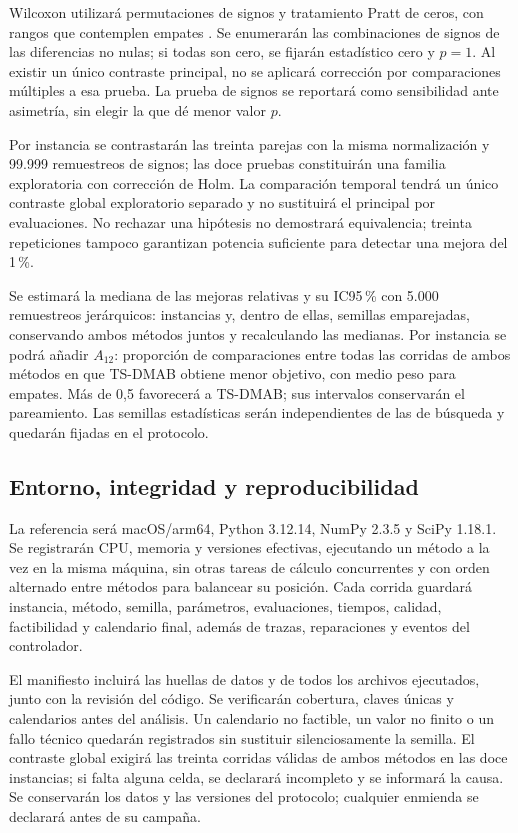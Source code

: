 Wilcoxon utilizará permutaciones de signos y tratamiento Pratt de ceros,
con rangos que contemplen empates
\parencite{scipy_wilcoxon,scipy_permutation}.
Se enumerarán las combinaciones de signos de las diferencias no nulas;
si todas son cero, se fijarán estadístico cero y $p=1$.
Al existir un único contraste principal, no se aplicará corrección por
comparaciones múltiples a esa prueba. La prueba de signos se reportará
como sensibilidad ante asimetría, sin elegir la que dé menor valor $p$.

Por instancia se contrastarán las treinta parejas con la misma
normalización y 99.999 remuestreos de signos; las doce pruebas
constituirán una familia exploratoria con corrección de Holm.
La comparación temporal tendrá un único contraste global exploratorio
separado y no sustituirá el principal por evaluaciones.
No rechazar una hipótesis no demostrará equivalencia;
treinta repeticiones tampoco garantizan potencia suficiente para detectar
una mejora del 1\,\%.

Se estimará la mediana de las mejoras relativas y su IC95\,\% con 5.000
remuestreos jerárquicos: instancias y, dentro de ellas, semillas emparejadas,
conservando ambos métodos juntos y recalculando las medianas.
Por instancia se podrá añadir $A_{12}$: proporción de comparaciones
entre todas las corridas de ambos métodos en que TS-DMAB obtiene menor
objetivo, con medio peso para empates. Más de 0,5 favorecerá a TS-DMAB;
sus intervalos conservarán el pareamiento. Las semillas estadísticas
serán independientes de las de búsqueda y quedarán fijadas en el protocolo.

\subsection{Entorno, integridad y reproducibilidad}
La referencia será macOS/arm64, Python 3.12.14, NumPy 2.3.5 y SciPy 1.18.1.
Se registrarán CPU, memoria y versiones efectivas, ejecutando un método
a la vez en la misma máquina, sin otras tareas de cálculo concurrentes
y con orden alternado entre métodos para balancear su posición.
Cada corrida guardará instancia, método, semilla, parámetros, evaluaciones,
tiempos, calidad, factibilidad y calendario final, además de trazas,
reparaciones y eventos del controlador.

El manifiesto incluirá las huellas de datos y de todos los archivos
ejecutados, junto con la revisión del código. Se verificarán cobertura,
claves únicas y calendarios antes del análisis. Un calendario no factible,
un valor no finito o un fallo técnico quedarán registrados sin sustituir
silenciosamente la semilla. El contraste global exigirá las treinta corridas
válidas de ambos métodos en las doce instancias; si falta alguna celda,
se declarará incompleto y se informará la causa.
Se conservarán los datos y las versiones del protocolo; cualquier
enmienda se declarará antes de su campaña.
